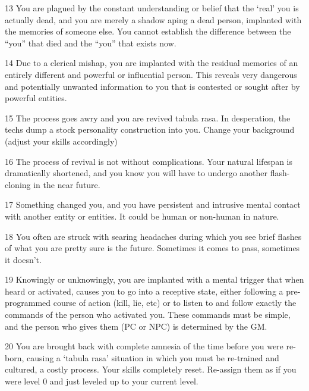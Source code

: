 13         You are plagued by the constant understanding or belief that the ‘real’ you is actually dead,
           and you are merely a shadow aping a dead person, implanted with the memories of someone
           else. You cannot establish the difference between the “you” that died and the “you” that exists
           now.

14         Due to a clerical mishap, you are implanted with the residual memories of an entirely different
           and powerful or influential person. This reveals very dangerous and potentially unwanted
           information to you that is contested or sought after by powerful entities.

15         The process goes awry and you are revived tabula rasa. In desperation, the techs dump a
           stock personality construction into you. Change your background (adjust your skills
           accordingly)

16         The process of revival is not without complications. Your natural lifespan is dramatically
           shortened, and you know you will have to undergo another flash-cloning in the near future.

17         Something changed you, and you have persistent and intrusive mental contact with another
           entity or entities. It could be human or non-human in nature.

18         You often are struck with searing headaches during which you see brief flashes of what you
           are pretty sure is the future. Sometimes it comes to pass, sometimes it doesn’t.




 19        Knowingly or unknowingly, you are implanted with a mental trigger that when heard or
           activated, causes you to go into a receptive state, either following a pre-programmed course
           of action (kill, lie, etc) or to listen to and follow exactly the commands of the person who
           activated you. These commands must be simple, and the person who gives them (PC or NPC)
           is determined by the GM.

 20        You are brought back with complete amnesia of the time before you were re-born, causing a
           ‘tabula rasa’ situation in which you must be re-trained and cultured, a costly process. Your
           skills completely reset. Re-assign them as if you were level 0 and just leveled up to your
           current level.






